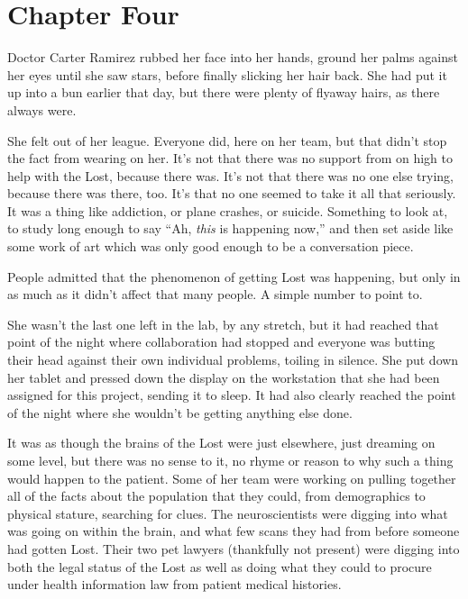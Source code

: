 \chapter*{Chapter Four}

Doctor Carter Ramirez rubbed her face into her hands, ground her palms against her eyes until she saw stars, before finally slicking her hair back.  She had put it up into a bun earlier that day, but there were plenty of flyaway hairs, as there always were.

She felt out of her league.  Everyone did, here on her team, but that didn't stop the fact from wearing on her.  It's not that there was no support from on high to help with the Lost, because there was.  It's not that there was no one else trying, because there was there, too.  It's that no one seemed to take it all that seriously.  It was a thing like addiction, or plane crashes, or suicide.  Something to look at, to study long enough to say ``Ah, \textit{this} is happening now,'' and then set aside like some work of art which was only good enough to be a conversation piece.

People admitted that the phenomenon of getting Lost was happening, but only in as much as it didn't affect that many people.  A simple number to point to.

She wasn't the last one left in the lab, by any stretch, but it had reached that point of the night where collaboration had stopped and everyone was butting their head against their own individual problems, toiling in silence.  She put down her tablet and pressed down the display on the workstation that she had been assigned for this project, sending it to sleep.  It had also clearly reached the point of the night where she wouldn't be getting anything else done.

It was as though the brains of the Lost were just elsewhere, just dreaming on some level, but there was no sense to it, no rhyme or reason to why such a thing would happen to the patient.  Some of her team were working on pulling together all of the facts about the population that they could, from demographics to physical stature, searching for clues.  The neuroscientists were digging into what was going on within the brain, and what few scans they had from before someone had gotten Lost.  Their two pet lawyers (thankfully not present) were digging into both the legal status of the Lost as well as doing what they could to procure under health information law from patient medical histories.


